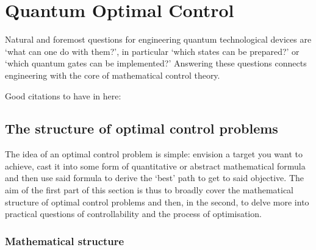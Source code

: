 \chapter{Quantum Optimal Control}\label{chap:3_Quantum_Optimal_control}



Natural and foremost questions for engineering quantum technological devices are ‘what can one do with them?’, in particular ‘which states can be prepared?’ or ‘which quantum gates can be implemented?’ Answering these questions connects engineering with the core of mathematical control theory.



Good citations to have in here: \cite{schirmer_complete_2001, koch_quantum_2022,glaser_training_2015}


\section{The structure of optimal control problems}\label{sec:3.1_structure_quantum_control}

The idea of an optimal control problem is simple: envision a target you want to achieve, cast it into some form of quantitative or abstract mathematical formula and then use said formula to derive the `best' path to get to said objective. The aim of the first part of this section is thus to broadly cover the mathematical structure of optimal control problems and then, in the second, to delve more into practical questions of controllability and the process of optimisation.

\subsection{Mathematical structure}\label{sec:3.1.1_mathematical_structure}


